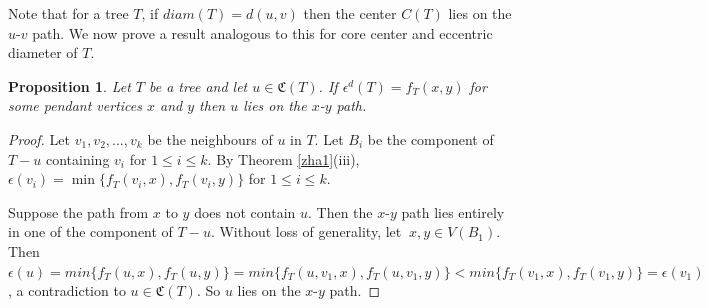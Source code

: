 \documentclass[10pt,a4paper]{amsart}
\newtheorem{proposition}[theorem]{Proposition}
\begin{document}
Note that for a tree $T$, if $diam(T)=d(u,v)$ then the center $C(T)$ lies on the $u$-$v$ path. We now prove a result analogous to this for core center and eccentric diameter of $T$.
\begin{proposition}\label{prop1}
Let $T$ be a tree and let $u\in \mathfrak{C}(T)$. If $\epsilon^d(T)=f_T(x,y)$ for some pendant vertices $x$ and $y$ then $u$ lies on the $x$-$y$ path. 
\end{proposition}
\begin{proof}
Let $v_1,v_2,\ldots, v_k$ be the neighbours of $u$ in $T$. Let $B_i$ be the component of $T-u$ containing $v_i$ for $1\leq i \leq k$. By Theorem \ref{zha1}(iii), $\epsilon(v_i)=\min\{f_T(v_i,x), f_T(v_i,y)\}$ for $1\leq i \leq k$.

Suppose the path from $x$ to $y$ does not contain $u$. Then the $x$-$y$ path lies entirely in one of the component of $T-u$. Without loss of generality, let  $\ x,y\in V(B_1)$. Then $\epsilon(u)=min\{f_T(u,x), f_T(u,y)\}=min\{f_T(u,v_1,x), f_T(u,v_1,y)\}< min\{f_T(v_1,x), f_T(v_1,y)\}=\epsilon (v_1)$, a contradiction to $u\in \mathfrak{C}(T)$. So $u$ lies on the $x$-$y$ path. 
\end{proof}
\end{document}
